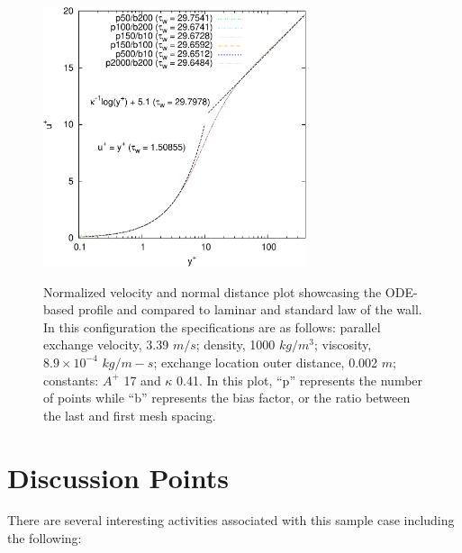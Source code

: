 \documentclass{article}
\begin{document}
\begin{figure}[!htbp]
  \centering
  {
   \includegraphics[height=3.0in]{images/ode_extrude-crop.pdf}
  }
  \caption{Normalized velocity and normal distance plot showcasing the ODE-based profile and compared to laminar
and standard law of the wall. In this configuration the specifications are as follows: parallel exchange velocity, 
3.39 $m/s$; density, 1000 $kg/m^3$; viscosity, $8.9 \times 10^{-4}$ $kg/m-s$; exchange location outer distance, 
0.002 $m$; constants: $A^+$ 17 and $\kappa$ 0.41. In this plot, ``p'' represents the number of points while 
``b'' represents the bias factor, or the ratio between the last and first mesh spacing.}
  \label{fig:ode}
\end{figure}

\section{Discussion Points}

There are several interesting activities associated with this sample case including
the following:
\end{document}
